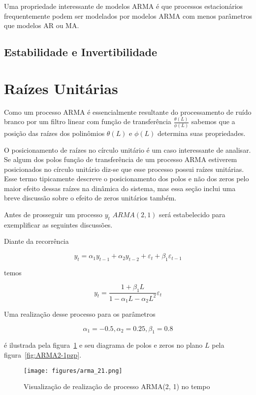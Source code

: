 Uma propriedade interessante de modelos ARMA é que processos estacionários
frequentemente podem ser modelados por modelos ARMA com menos parâmetros que
modelos AR ou MA.

\subsection{Estabilidade e Invertibilidade}
\label{ssec:stability_invertibility}

\section{Raízes Unitárias}
\label{sec:unit_roots}

Como um processo ARMA é essencialmente resultante do processamento de ruído
branco por um filtro linear com função de transferência
$\frac{\theta(L)}{\phi(L)}$ sabemos que a posição das raízes dos polinômios
$\theta(L)$ e $\phi(L)$ determina suas propriedades.

O posicionamento de raízes no círculo unitário é um caso interessante de
analisar. Se algum dos polos função de transferência de um processo ARMA
estiverem posicionados no círculo unitário diz-se que esse processo possui
raízes unitárias. Esse termo tipicamente descreve o posicionamento dos polos e
não dos zeros pelo maior efeito dessas raízes na dinâmica do sistema, mas essa
seção inclui uma breve discussão sobre o efeito de zeros unitários também.

Antes de prosseguir um processo $y_t$ $ARMA(2, 1)$ será estabelecido para
exemplificar as seguintes discussões.

Diante da recorrência

$$ y_t = \alpha_1 y_{t-1} + \alpha_2 y_{t-2} + \varepsilon_t + \beta_1 \varepsilon_{t-1}$$

temos

$$ y_t = \frac{1 + \beta_1L}{1 - \alpha_1 L - \alpha_2 L^2} \varepsilon_t $$

Uma realização desse processo para os parâmetros

$$\alpha_1 = -0.5, \alpha_2 = 0.25, \beta_1 = 0.8$$

é ilustrada pela figura~\ref{fig:ARMA2-1} e seu diagrama de polos e zeros
no plano $L$ pela figura~\ref{fig:ARMA2-1pzp}.

\begin{figure}[H]
    \centering
    \texttt{[image: figures/arma\_21.png]}
    \caption{Visualização de realização de processo ARMA(2, 1) no tempo}
    \label{fig:ARMA2-1}
\end{figure}


